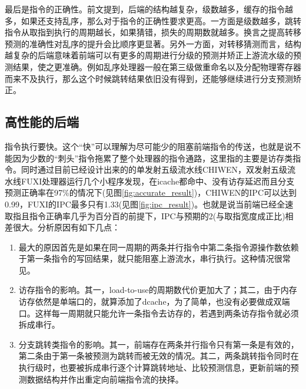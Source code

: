 	最后是指令的正确性。前文提到，后端的结构越复杂，级数越多，缓存的指令越多，如果还支持乱序，那么对于指令的正确性要求更高。一方面是级数越多，跳转指令从取指到执行的周期越长，如果猜错，损失的周期数就越多。换言之提高转移预测的准确性对乱序的提升会比顺序更显著。另外一方面，对转移猜测而言，结构越复杂的后端意味着前端可以有更多的周期进行分级的预测并矫正上游流水级的预测结果，使之更准确。例如乱序处理器一般在第三级做重命名以及分配物理寄存器而来不及执行，那么这个时候跳转结果依旧没有得到，还能够继续进行分支预测矫正。
	
	\subsection{高性能的后端}
	
	指令执行要快。这个``快''可以理解为尽可能少的阻塞前端指令的传送，也就是说不能因为少数的``刺头''指令拖累了整个处理器的指令通路，这里指的主要是访存类指令。同时通过目前已经设计出来的的单发射五级流水线CHIWEN，双发射五级流水线FUXI处理器运行几个小程序发现，在icache都命中、没有访存延迟而且分支预测正确率在97\%的情况下(见图\ref{fig:accurate_result})，CHIWEN的IPC可以达到0.99，FUXI的IPC最多只有1.33(见图\ref{fig:ipc_result})。也就是说当前端已经全速取指且指令正确率几乎为百分百的前提下，IPC与预期的2(与取指宽度成正比)相差很大。分析原因有如下几点：
	\begin{enumerate}[label=(\alph*)]
		\item 最大的原因首先是如果在同一周期的两条并行指令中第二条指令源操作数依赖于第一条指令的写回结果，就只能阻塞上游流水，串行执行。这种情况很常见。
		\item 访存指令的影响。其一，load-to-use的周期数代价更加大了；其二，由于内存访存依然是单端口的，就算添加了dcache，为了简单，也没有必要做成双端口。这样每一周期就只能允许一条指令去访存的，若遇到两条访存指令就必须拆成串行。
		\item 分支跳转类指令的影响。其一，前端存在两条并行指令只有第一条是有效的，第二条由于第一条被预测为跳转而被无效的情况。其二，两条跳转指令同时在执行级时，也要被拆成串行逐个计算跳转地址、比较预测信息，更新前端的预测数据结构并作出重定向前端指令流的抉择。
	\end{enumerate}

